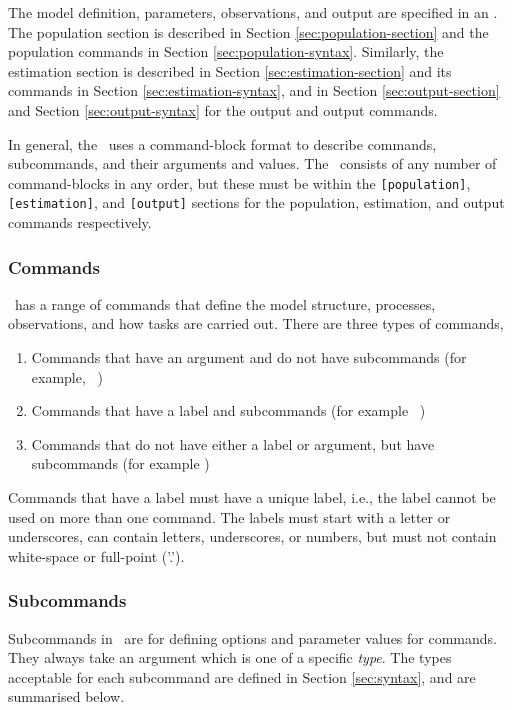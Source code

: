 The model definition, parameters, observations, and output are specified in an \config. The  population section is described in Section \ref{sec:population-section} and the population commands in Section \ref{sec:population-syntax}. Similarly, the estimation section is described in Section \ref{sec:estimation-section} and its commands in Section \ref{sec:estimation-syntax}, and in Section \ref{sec:output-section} and Section \ref{sec:output-syntax} for the output and output commands. 

In general, the \config\ uses a command-block format to describe commands, subcommands, and their arguments and values. The \config\ consists of any number of command-blocks in any order, but these must be within the \texttt{[population]}, \texttt{[estimation]}, and  \texttt{[output]} sections for the population, estimation, and output commands respectively. 

\subsubsection{Commands}

\SPM\ has a range of commands that define the model structure, processes, observations, and how tasks are carried out. There are three types of commands, 

\begin{enumerate}
\item Commands that have an argument and do not have subcommands (for example, \ )
\item Commands that have a label and subcommands (for example \ )
\item Commands that do not have either a label or argument, but have subcommands (for example )
\end{enumerate}

Commands that have a label must have a unique label, i.e., the label cannot be used on more than one command. The labels must start with a letter or underscores, can contain letters, underscores, or numbers, but must not contain white-space or full-point ('.').

\subsubsection{Subcommands}

Subcommands in \SPM\ are for defining options and parameter values for commands. They always take an argument which is one of a specific \emph{type}. The types acceptable for each subcommand are defined in Section \ref{sec:syntax}, and are summarised below. 

